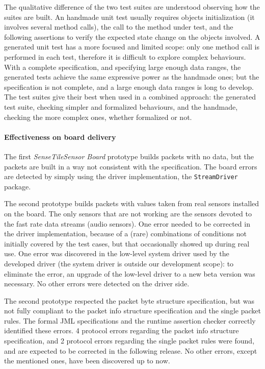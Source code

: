 \documentclass{article}
\newcommand{\lil}[1]{\texttt{\lstinline|#1|}}
\newcommand{\ST}{\emph{SenseTile}\xspace}
\newcommand{\SB}{\emph{Sensor Board}\xspace}
\newcommand{\STSB}{\ST \SB\xspace}
\begin{document}
The qualitative difference of the two test suites are understood observing how the suites are built. 
An handmade unit test usually requires objects initialization (it involves several method calls), the call to the method under test, and the following assertions to verify the expected state change on the objects involved. 
A generated unit test has a more focused and limited scope: only one method call is performed in each test, therefore it is difficult to explore complex behaviours. 
With a complete specification, and specifying large enough data ranges, the generated tests achieve the same expressive power as the handmade ones; but the specification is not complete, and a large enough data ranges is long to develop.
The test suites give their best when used in a combined approach: the generated test suite, checking simpler and formalized behaviours, and the handmade, checking the more complex ones, whether formalized or not.  



\paragraph*{Effectiveness on board delivery}

The first \STSB prototype builds packets with no data, but the packets are built in a way not consistent with the specification.  
The board errors are detected by simply using the driver implementation, the \lil{StreamDriver} package.

The second prototype builds packets with values taken from real sensors installed on the board.  
The only sensors that are not working are the sensors devoted to the fast rate data streams (audio sensors).  
One error needed to be corrected in the driver implementation, because of a (rare) combinations of conditions not initially covered by the test cases, but that occasionally showed up during real use.
One error was discovered in the low-level system driver used by the developed driver (the system driver is outside our development scope): to eliminate the error, an upgrade of the low-level driver to a new beta version was necessary. 
No other errors were detected on the driver side.

The second prototype respected the packet byte structure specification, but was not fully compliant to the packet info structure specification and the single packet rules.
The formal JML specifications and the runtime assertion checker correctly identified these errors.
4 protocol errors regarding the packet info structure specification, and 2 protocol errors regarding the single packet rules were found, and are expected to be corrected in the following release. 
No other errors, except the mentioned ones, have been discovered up to now.
\end{document}

